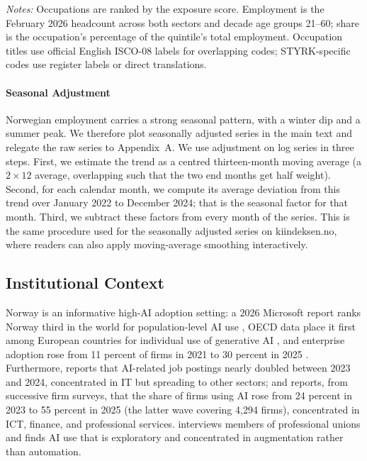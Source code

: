 \documentclass[12pt]{article}
\begin{document}
\begin{table}[htbp]
\centering
\caption{Five largest occupations by AI-exposure quintile, February 2026.}
\label{tab:quintile_top_occ}
\footnotesize

\begin{minipage}{\textwidth}\footnotesize\textit{Notes:} Occupations are ranked by the \citet{eloundou2024} exposure score. Employment is the February 2026 headcount across both sectors and decade age groups 21--60; share is the occupation's percentage of the quintile's total employment. Occupation titles use official English ISCO-08 labels for overlapping codes; STYRK-specific codes use register labels or direct translations.\end{minipage}
\end{table}


\paragraph{Seasonal Adjustment}

Norwegian employment carries a strong seasonal pattern, with a winter dip and a summer peak. We therefore plot seasonally adjusted series in the main text and relegate the raw series to Appendix~A. We use adjustment on log series in three steps. First, we estimate the trend as a centred thirteen-month moving average (a $2\times12$ average, overlapping such that the two end months get half weight). Second, for each calendar month, we compute its average deviation from this trend over January 2022 to December 2024; that is the seasonal factor for that month. Third, we subtract these factors from every month of the series. This is the same procedure used for the seasonally adjusted series on kiindeksen.no, where readers can also apply moving-average smoothing interactively.


\subsection{Institutional Context}\label{sec:data:institutions}

Norway is an informative high-AI adoption setting: a 2026 Microsoft report ranks Norway third in the world for population-level AI use \citep{microsoft2026ai}, OECD data place it first among European countries for individual use of generative AI \citep{oecd2026ai}, and enterprise adoption rose from 11 percent of firms in 2021 to 30 percent in 2025 \citep{ssb2025ikt}. Furthermore, \citet{kompetansebehovsutvalget2026} reports that AI-related job postings nearly doubled between 2023 and 2024, concentrated in IT but spreading to other sectors; and \citet{samfunnsok2026} reports, from successive firm surveys, that the share of firms using AI rose from 24 percent in 2023 to 55 percent in 2025 (the latter wave covering 4{,}294 firms), concentrated in ICT, finance, and professional services. \citet{nifu2024} interviews members of professional unions and finds AI use that is exploratory and concentrated in augmentation rather than automation.
\end{document}
